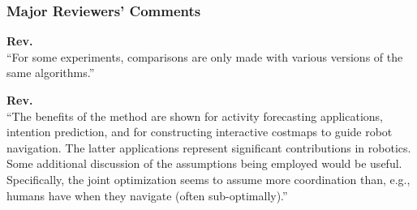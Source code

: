 \logo{}

\begin{frame}
	\frametitle{Major Reviewers' Comments}
	
	\large
	
	\textbf{Rev.}\\
	``For some experiments, comparisons are only made with various versions of the same algorithms.''
	
	\vspace{0.3cm}
	
	\textbf{Rev.}\\
	``The benefits of the method are shown for activity forecasting applications, intention prediction,
	and for constructing interactive costmaps to guide robot navigation. The latter applications
	represent significant contributions in robotics. Some additional discussion of the assumptions being  
	employed would be useful. Specifically, the joint optimization seems to assume more coordination
	than, e.g., humans have when they navigate (often sub-­optimally).'' \\
\end{frame}

\logo
{
	\vspace{199.1pt}
}

